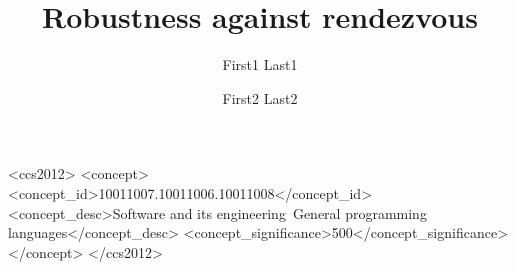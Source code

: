 \documentclass[acmsmall,10pt,review,anonymous]{acmart}\settopmatter{printfolios=true}
\title[Robustness]{Robustness against rendezvous} %
\author{First1 Last1}
\affiliation{
  \position{Position1}
  \department{Department1}              %
  \institution{Institution1}            %
  \streetaddress{Street1 Address1}
  \city{City1}
  \state{State1}
  \postcode{Post-Code1}
  \country{Country1}
}
\author{First2 Last2}
\affiliation{
  \position{Position2a}
  \department{Department2a}             %
  \institution{Institution2a}           %
  \streetaddress{Street2a Address2a}
  \city{City2a}
  \state{State2a}
  \postcode{Post-Code2a}
  \country{Country2a}
}
\affiliation{
  \position{Position2b}
  \department{Department2b}             %
  \institution{Institution2b}           %
  \streetaddress{Street3b Address2b}
  \city{City2b}
  \state{State2b}
  \postcode{Post-Code2b}
  \country{Country2b}
}
\begin{document}




\begin{abstract}
\end{abstract}



\begin{CCSXML}
<ccs2012>
<concept>
<concept_id>10011007.10011006.10011008</concept_id>
<concept_desc>Software and its engineering~General programming languages</concept_desc>
<concept_significance>500</concept_significance>
</concept>
</ccs2012>
\end{CCSXML}









\maketitle







%
%
%
%

\clearpage

%

\end{document}
